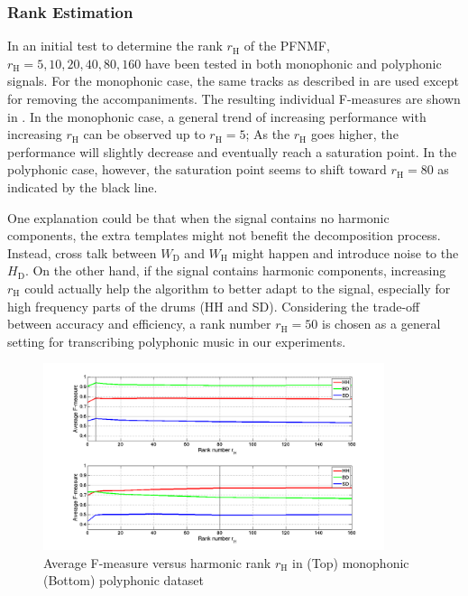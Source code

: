 \documentclass{article}
\begin{document}
\subsubsection{Rank Estimation}\label{rank}
In an initial test to determine the rank $r_\mathrm{H}$ of the PFNMF, $r_\mathrm{H} = {5, 10, 20, 40, 80, 160}$ have been tested in both monophonic and polyphonic signals. For the monophonic case, the same tracks as described in  are used except for removing the accompaniments. The resulting individual F-measures are shown in . In the monophonic case, a general trend of increasing performance with increasing $r_\mathrm{H}$ can be observed up to $r_\mathrm{H} = 5$; As the $r_\mathrm{H}$ goes higher, the performance will slightly decrease and eventually reach a saturation point. In the polyphonic case, however, the saturation point seems to shift toward $r_\mathrm{H} = 80$ as indicated by the black line. 

One explanation could be that when the signal contains no harmonic components, the extra templates might not benefit the decomposition process. Instead, cross talk between $W_\mathrm{D}$ and $W_\mathrm{H}$ might happen and introduce noise to the $H_\mathrm{D}$. On the other hand, if the signal contains harmonic components, increasing $r_\mathrm{H}$ could actually help the algorithm to better adapt to the signal, especially for high frequency parts of the drums (HH and SD). Considering the trade-off between accuracy and efficiency, a rank number $r_\mathrm{H} = 50$ is chosen as a general setting for transcribing polyphonic music in our experiments.

\begin{figure}
 \centerline{
 \includegraphics[width=10cm]{testOnK_mono_poly.png}}
 \caption{Average F-measure versus harmonic rank $r_\mathrm{H}$ in (Top) monophonic (Bottom) polyphonic dataset}%
 \label{fig:rankTest}
\end{figure}
\end{document}
